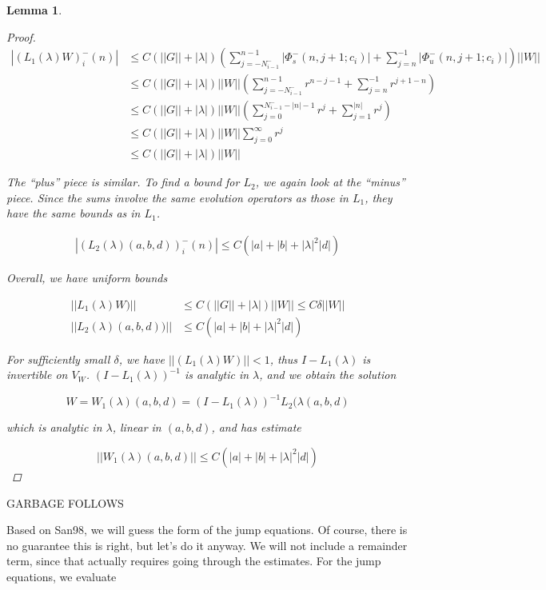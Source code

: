 \documentclass[12pt]{article}
\newtheorem{lemma}{Lemma}
\begin{document}
\begin{lemma}
\begin{proof}
\begin{align*}
|(L_1(\lambda)W)_i^-(n)| &\leq C (||G|| + |\lambda|)\left(
\sum_{j = -N_{i-1}^-}^{n-1} |\Phi_s^-(n, j+1; c_i)| + \sum_{j = n}^{-1} |\Phi_u^-(n, j+1; c_i)| \right) ||W|| \\
&\leq C (||G|| + |\lambda|) ||W||
\left( \sum_{j = -N_{i-1}^-}^{n-1} r^{n - j - 1} + \sum_{j = n}^{-1} r^{j+1-n} \right) \\
&\leq C (||G|| + |\lambda|) ||W||
\left( \sum_{j = 0}^{N_{i-1}^- -|n| -1} r^j + \sum_{j = 1}^{|n|} r^j \right) \\
&\leq C (||G|| + |\lambda|) ||W||\sum_{j = 0}^\infty r^j \\
&\leq C (||G|| + |\lambda|)||W||
\end{align*}

The ``plus'' piece is similar. To find a bound for $L_2$, we again look at the ``minus'' piece. Since the sums involve the same evolution operators as those in $L_1$, they have the same bounds as in $L_1$.

\begin{align*}
|(L_2(\lambda)(a,b,d))_i^-(n)| \leq C\left( |a| + |b| + |\lambda|^2 |d| \right)
\end{align*}

Overall, we have uniform bounds

\begin{align*}
||L_1(\lambda)W)|| &\leq C \left(||G|| + |\lambda| \right)||W|| \leq C \delta ||W|| \\
||L_2(\lambda)(a,b,d))|| &\leq C\left( |a| + |b| + |\lambda|^2 |d| \right)
\end{align*}

For sufficiently small $\delta$, we have $||(L_1(\lambda)W)|| < 1$, thus $I - L_1(\lambda)$ is invertible on $V_W$. $(I - L_1(\lambda))^{-1}$ is analytic in $\lambda$, and we obtain the solution 

\[
W = W_1(\lambda)(a,b,d) = (I - L_1(\lambda))^{-1} L_2(\lambda(a,b,d)
\]

which is analytic in $\lambda$, linear in $(a, b, d)$, and has estimate

\[
||W_1(\lambda)(a,b,d)|| \leq C \left( |a| + |b| + |\lambda|^2 |d| \right)
\]

\end{proof}
\end{lemma}



GARBAGE FOLLOWS

Based on San98, we will guess the form of the jump equations. Of course, there is no guarantee this is right, but let's do it anyway. We will not include a remainder term, since that actually requires going through the estimates. For the jump equations, we evaluate
\end{document}

